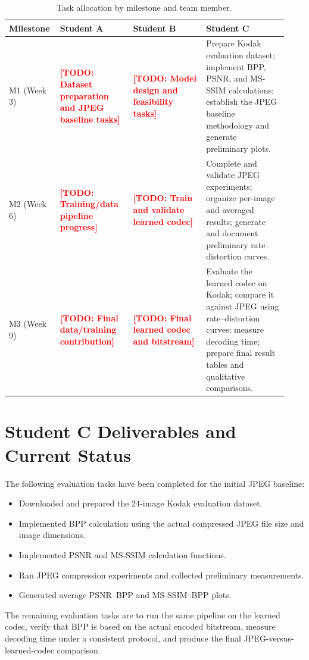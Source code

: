 \documentclass[11pt]{article}
\newcommand{\todo}[1]{\textcolor{red}{\textbf{[TODO: #1]}}}
\begin{document}
\begin{table}[htbp]
\centering
\caption{Task allocation by milestone and team member.}
\small
\begin{tabular}{@{}p{0.14\linewidth}p{0.25\linewidth}p{0.25\linewidth}p{0.29\linewidth}@{}}
\toprule
\textbf{Milestone} & \textbf{Student A} & \textbf{Student B} & \textbf{Student C} \\
\midrule
M1 (Week 3) &
\todo{Dataset preparation and JPEG baseline tasks} &
\todo{Model design and feasibility tasks} &
Prepare Kodak evaluation dataset; implement BPP, PSNR, and
MS-SSIM calculations; establish the JPEG baseline methodology
and generate preliminary plots. \\

M2 (Week 6) &
\todo{Training/data pipeline progress} &
\todo{Train and validate learned codec} &
Complete and validate JPEG experiments; organize per-image
and averaged results; generate and document preliminary
rate--distortion curves. \\

M3 (Week 9) &
\todo{Final data/training contribution} &
\todo{Final learned codec and bitstream} &
Evaluate the learned codec on Kodak; compare it against JPEG
using rate--distortion curves; measure decoding time; prepare
final result tables and qualitative comparisons. \\
\bottomrule
\end{tabular}
\end{table}

\section{Student C Deliverables and Current Status}

The following evaluation tasks have been completed for the initial
JPEG baseline:
\begin{itemize}[leftmargin=*]
    \item Downloaded and prepared the 24-image Kodak evaluation dataset.
    \item Implemented BPP calculation using the actual compressed
    JPEG file size and image dimensions.
    \item Implemented PSNR and MS-SSIM calculation functions.
    \item Ran JPEG compression experiments and collected preliminary
    measurements.
    \item Generated average PSNR--BPP and MS-SSIM--BPP plots.
\end{itemize}

The remaining evaluation tasks are to run the same pipeline on the
learned codec, verify that BPP is based on the actual encoded
bitstream, measure decoding time under a consistent protocol, and
produce the final JPEG-versus-learned-codec comparison.



\end{document}
